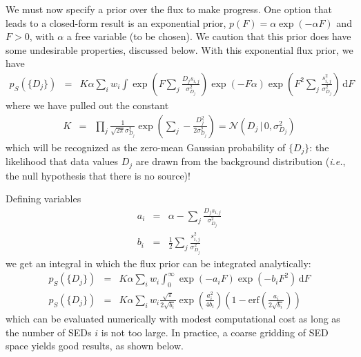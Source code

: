 \documentclass[11pt,letterpaper,linenumbers]{aastex63}
\newcommand{\latin}[1]{\emph{#1}}
\newcommand{\ie}{\latin{i.e.}}
\newcommand{\gaussianN}{\mathcal{N}}
\newcommand{\gaussian}[1]{\gaussianN\!\left(#1\right)}
\newcommand{\dd}{\mathrm{d}}
\newcommand{\erf}{\textrm{erf}}
\begin{document}
We must now specify a prior over the flux to make progress.  One
option that leads to a closed-form result is an exponential prior,
$p(F) = \alpha \exp(-\alpha F)$ and $F > 0$, with $\alpha$ a free
variable (to be chosen).  We caution that this prior does have some
undesirable properties, discussed below.  With this exponential flux
prior, we have
\begin{eqnarray}
  p_S(\{ D_j \})
  &=&
  K \alpha
  \sum_i w_i 
  \int 
    \exp{ \left( F \sum_j \frac{D_j s_{i,j}}{\sigma_{D_j}^2} \right)}
    \exp{ \left( -F \alpha \right)}
    \exp{ \left( F^2 \sum_j \frac{s_{i,j}^2}{\sigma_{D_j}^2} \right)}
    \, \dd F
\end{eqnarray}
where we have pulled out the constant
\begin{eqnarray}
K &=& \prod_j \frac{1}{\sqrt{2 \pi} \sigma_{D_j}^2} 
\exp{\left( \sum_j -\frac{D_j^2}{2 \sigma_{D_j}^2} \right)}
= \gaussian{D_j \,|\, 0, \sigma_{D_j}^2}
\label{eq:pbg}
\end{eqnarray}
which will be recognized as the zero-mean Gaussian probability of
$\{D_j\}$: the likelihood that data values $D_j$ are drawn from the
background distribution (\ie, the null hypothesis that there is no
source)!

Defining variables
\begin{eqnarray}
  a_i &=& \alpha - \sum_j \frac{D_j s_{i,j}}{\sigma_{D_j}^2} \\
  b_i &=& \frac{1}{2} \sum_j \frac{s_{i,j}^2}{\sigma_{D_j}^2}
\end{eqnarray}
we get an integral in which the flux prior can be integrated analytically:
%
\begin{eqnarray}
  p_S(\{ D_j \})
  &=&
  K \alpha
  \sum_i w_i 
  \int_0^{\infty}
    \exp(-a_i F) \exp(-b_i F^2)
    \, \dd F
    \\
  p_S(\{ D_j \})
  &=&
  K \alpha
  \sum_i w_i 
  \frac{\sqrt{\pi}}{2 \sqrt{b_i}}
  \exp \left(\frac{a_i^2}{4 b_i} \right)
  \left(1 - \erf\left( \frac{a_i}{2 \sqrt{b_i}} \right) \right)
  \label{eq:pfg}
\end{eqnarray}
which can be evaluated numerically with modest computational cost as
long as the number of SEDs $i$ is not too large.  In practice, a
coarse gridding of SED space yields good results, as shown below.
\end{document}

